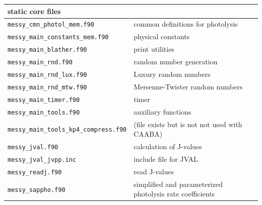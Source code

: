 \documentclass[twoside]{article}
\begin{document}
\begin{table}
\begin{center}
\begin{tabular}{lp{}}
      \hline
      \multicolumn{2}{l}{static core files}\\
      \hline
      \verb|messy_cmn_photol_mem.f90|          & common definitions for photolysis\\
      \verb|messy_main_constants_mem.f90|      & physical constants\\
      \verb|messy_main_blather.f90|            & print utilities\\
      \verb|messy_main_rnd.f90|                & random number generation\\
      \verb|messy_main_rnd_lux.f90|            & Luxury random numbers\\
      \verb|messy_main_rnd_mtw.f90|            & Mersenne-Twister random numbers\\
      \verb|messy_main_timer.f90|              & timer\\
      \verb|messy_main_tools.f90|              & auxiliary functions\\
      \verb|messy_main_tools_kp4_compress.f90| & (file exists but is not
                                                 not used with CAABA)\\
      \verb|messy_jval.f90|                    & calculation of J-values\\
      \verb|messy_jval_jvpp.inc|               & include file for JVAL\\
      \verb|messy_readj.f90|                   & read J-values\\
      \verb|messy_sappho.f90|                  & simplified and parameterized 
                                                 photolysis rate coefficients\\

\end{tabular}
\end{center}
\end{table}
\end{document}
